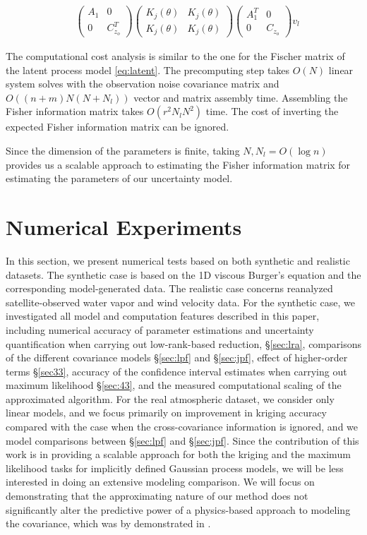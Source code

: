 \documentclass[article,ij4uq]{ij4uq}              %
\begin{document}
\begin{align}
    &\begin{pmatrix}A_{1}&0\\0&C_{z_{o}}^{T}\end{pmatrix}\begin{pmatrix}K_{j}(\theta)&K_{j}(\theta)\\K_{j}(\theta)&K_{j}(\theta)\end{pmatrix}\begin{pmatrix}A_{1}^{T}&0\\0&C_{z_{o}}\end{pmatrix}v_{l}\label{eq:joint}
\end{align}
\par The computational cost analysis is  similar to the one for the Fischer matrix of the latent process model \eqref{eq:latent}. The precomputing step takes $O(N)$ linear system solves with the observation noise covariance matrix and $O((n+m)N(N+N_{l}))$ vector and matrix assembly time. Assembling the Fisher information matrix takes $O(r^{2}N_{l}N^{2})$ time. The cost of inverting the expected Fisher information matrix can be ignored.
\par Since the dimension of the parameters is finite, taking $N,N_{l}=O(\log{n})$ provides us a scalable approach to estimating the Fisher information matrix for estimating the parameters of our uncertainty model.

\section{Numerical Experiments}\label{sec5}
\par In this section, we present numerical tests based on both synthetic and realistic datasets. The synthetic case is based on the 1D viscous Burger's equation and the corresponding model-generated data. The realistic case concerns reanalyzed satellite-observed water vapor and wind velocity data. For the synthetic case, we investigated all model and computation features described in this paper, including numerical accuracy of parameter estimations and uncertainty quantification when carrying out low-rank-based reduction,
\S \ref{sec:lra}, comparisons of the different covariance models \S \ref{sec:lpf} and \S \ref{sec:jpf}, effect of higher-order terms \S \ref{sec33}, accuracy of the confidence interval estimates when carrying out maximum likelihood \S \ref{sec:43}, and the measured computational scaling of the approximated algorithm. For the real atmospheric dataset, we consider only linear models, and we focus primarily on improvement in kriging accuracy compared with the case when the cross-covariance information is ignored, and we  model comparisons between \S \ref{sec:lpf} and \S \ref{sec:jpf}. Since the contribution of this work is in providing a scalable approach for both the kriging and the maximum likelihood tasks for implicitly defined Gaussian process models, we will be less interested in doing an extensive modeling comparison. We will focus on demonstrating that the approximating nature of our method does not significantly alter the predictive power of a physics-based approach to  modeling  the covariance, which was by  demonstrated in 
\cite{CovModel}.
\end{document}
